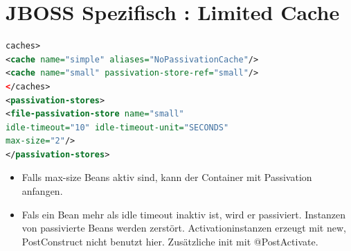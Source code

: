 \documentclass[a4paper,10pt]{scrreprt}
\begin{document}
\section{JBOSS Spezifisch : Limited Cache}
\begin{lstlisting}[caption=Limited Cache,language=xml]
 caches>
<cache name="simple" aliases="NoPassivationCache"/>
<cache name="small" passivation-store-ref="small"/>
</caches>
<passivation-stores>
<file-passivation-store name="small"
idle-timeout="10" idle-timeout-unit="SECONDS"
max-size="2"/>
</passivation-stores>
\end{lstlisting}
\begin{itemize}
 \item Falls max-size Beans aktiv sind, kann der Container mit  Passivation anfangen.
 \item Fals ein Bean mehr als idle timeout inaktiv ist, wird er passiviert.
 \subitem Instanzen von passivierte Beans werden zerstört.
  \subitem Activationinstanzen erzeugt mit new, PostConstruct nicht benutzt hier.
  \subitem Zusätzliche init mit @PostActivate.
\end{itemize}
\end{document}

